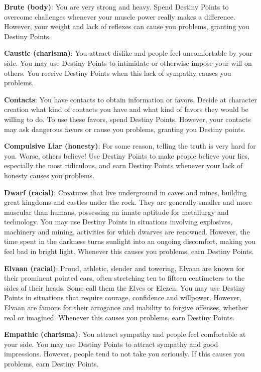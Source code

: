 \begin{multicols}{2}
\textbf{Brute (body)}: You are very strong and
heavy. Spend Destiny Points to overcome
challenges whenever your muscle power really
makes a difference. However, your weight and lack
of reflexes can cause you problems, granting you
Destiny Points.

\textbf{Caustic (charisma)}: You attract dislike
and people feel uncomfortable by your side. You
may use Destiny Points to intimidate or otherwise
impose your will on others. You receive Destiny
Points when this lack of sympathy causes you
problems.

\textbf{Contacts}: You have contacts to obtain
information or favors. Decide at character creation
what kind of contacts you have and what kind of
favors they would be willing to do. To use these
favors, spend Destiny Points. However, your
contacts may ask dangerous favors or cause you
problems, granting you Destiny points.

\textbf{Compulsive Liar (honesty)}: For some
reason, telling the truth is very hard for you. Worse,
others believe! Use Destiny Points to make people
believe your lies, especially the most ridiculous,
and earn Destiny Points whenever your lack of
honesty causes you problems.

\textbf{Dwarf (racial)}:
Creatures that live underground in caves and
mines, building great kingdoms and castles
under the rock. They are generally smaller
and more muscular than humans, possessing an
innate aptitude for metallurgy and technology.
You may use Destiny Points in situations involving
explosives, machinery and mining, activities for
which dwarves are renowned. However, the time
spent in the darkness turns sunlight into an
ongoing discomfort, making you feel bad in bright
light. Whenever this causes you problems, earn
Destiny Points.

\textbf{Elvaan (racial)}: Proud, athletic, slender and
towering, Elvaan are known for their prominent pointed
ears, often stretching ten to fifteen centimeters to the
sides of their heads. Some call them the Elves or Elezen.
You may use Destiny Points in situations that require
courage, confidence and willpower. However, Elvaan
are famous for their arrogance and inability to
forgive offenses, whether real or imagined.
Whenever this causes you problems, earn Destiny
Points.

\textbf{Empathic (charisma)}: You attract
sympathy and people feel comfortable at your side.
You may use Destiny Points to attract sympathy
and good impressions. However, people tend to
not take you seriously. If this causes you problems,
earn Destiny Points.


\end{multicols}
